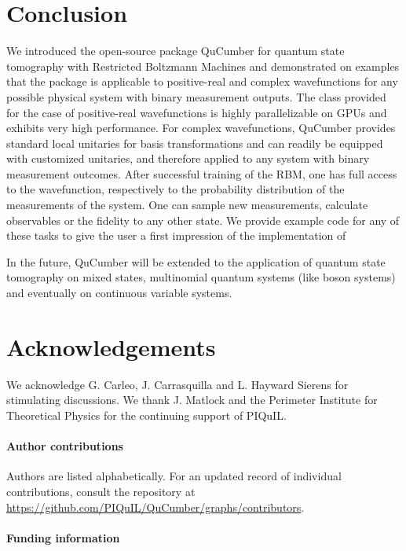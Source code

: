 \documentclass[submission, Phys, hidelnks]{SciPost}
\newcommand{\red}[1]{{\color{red} #1}}
\begin{document}
\section{Conclusion}
\red{
We introduced the open-source package QuCumber for quantum state tomography with Restricted Boltzmann Machines and demonstrated on examples that
the package is applicable to positive-real and complex wavefunctions for any possible physical system with binary measurement outputs.
The class provided for the case of positive-real wavefunctions is highly parallelizable on GPUs and exhibits very high performance.
For complex wavefunctions, QuCumber provides standard local unitaries for basis transformations
and can readily be equipped with customized unitaries, and therefore applied to any system with binary measurement outcomes.
After successful training of the RBM, one has full access to the wavefunction, respectively to the probability distribution of the measurements of the system.
One can sample new measurements, calculate observables or the fidelity to any other state.
We provide example code for any of these tasks to give the user a first impression of the implementation of

In the future, QuCumber will be extended to the application of quantum state tomography on mixed states, multinomial quantum systems (like boson systems) and eventually on continuous variable systems.
}

\section*{Acknowledgements}
We acknowledge G. Carleo, J. Carrasquilla and L. Hayward Sierens for stimulating discussions. 
We thank J. Matlock and the Perimeter Institute for Theoretical Physics for the continuing support of PIQuIL.

\paragraph{Author contributions}
Authors are listed alphabetically. For an updated record of individual contributions, consult the repository at \url{https://github.com/PIQuIL/QuCumber/graphs/contributors}.

\paragraph{Funding information}
\end{document}

